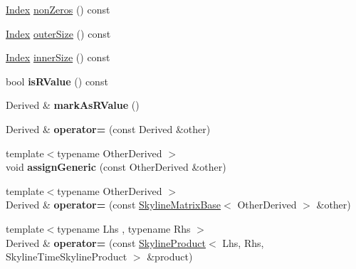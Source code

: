 \begin{DoxyCompactItemize}
\hyperlink{group___core___module_a554f30542cc2316add4b1ea0a492ff02}{Index} \hyperlink{class_eigen_1_1_skyline_matrix_base_aaeda265186dd626052df8580779b7460}{non\+Zeros} () const
\item 
\hyperlink{group___core___module_a554f30542cc2316add4b1ea0a492ff02}{Index} \hyperlink{class_eigen_1_1_skyline_matrix_base_a63cc4a263d32a8a225e4a42e891b8ac0}{outer\+Size} () const
\item 
\hyperlink{group___core___module_a554f30542cc2316add4b1ea0a492ff02}{Index} \hyperlink{class_eigen_1_1_skyline_matrix_base_a901f2691facc1a0321740300dc7a12d7}{inner\+Size} () const
\item 
\mbox{\label{class_eigen_1_1_skyline_matrix_base_ae6d374973777f0a193e36e77a3279f7c}} 
bool {\bfseries is\+R\+Value} () const
\item 
\mbox{\label{class_eigen_1_1_skyline_matrix_base_ae0b3e38f3b61c0625446d43fff3f5a2b}} 
Derived \& {\bfseries mark\+As\+R\+Value} ()
\item 
\mbox{\label{class_eigen_1_1_skyline_matrix_base_a37bc55eac2ec8ae4b560247435f30a3c}} 
Derived \& {\bfseries operator=} (const Derived \&other)
\item 
\mbox{\label{class_eigen_1_1_skyline_matrix_base_aa292a7a59be094f9d3184210623ed5ec}} 
{\footnotesize template$<$typename Other\+Derived $>$ }\\void {\bfseries assign\+Generic} (const Other\+Derived \&other)
\item 
\mbox{\label{class_eigen_1_1_skyline_matrix_base_a1714d938a0fa098cb74b627cf84abd08}} 
{\footnotesize template$<$typename Other\+Derived $>$ }\\Derived \& {\bfseries operator=} (const \hyperlink{class_eigen_1_1_skyline_matrix_base}{Skyline\+Matrix\+Base}$<$ Other\+Derived $>$ \&other)
\item 
\mbox{\label{class_eigen_1_1_skyline_matrix_base_a1e10c3dcfbb53b77f471773310e61545}} 
{\footnotesize template$<$typename Lhs , typename Rhs $>$ }\\Derived \& {\bfseries operator=} (const \hyperlink{class_eigen_1_1_skyline_product}{Skyline\+Product}$<$ Lhs, Rhs, Skyline\+Time\+Skyline\+Product $>$ \&product)

\end{DoxyCompactItemize}
